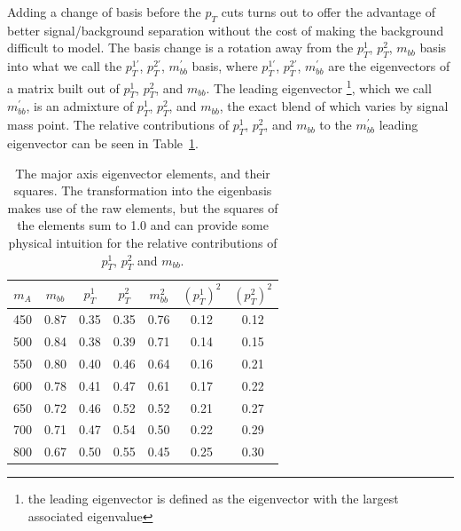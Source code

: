 Adding a change of basis before the $p_T$ cuts turns out to offer the advantage
of better signal/background separation without the cost of making the background
difficult to model.  The basis change is a rotation away from the $p_T^1$, 
$p_T^2$, $m_{bb}$ basis into what we call the $p_T^{1'}$, $p_T^{2'}$, $m_{bb}^{'}$
basis, where $p_T^{1'}$, $p_T^{2'}$, $m_{bb}^{'}$ are the eigenvectors of 
a matrix built out of $p_T^1$, $p_T^2$, and $m_{bb}$.  The leading eigenvector 
\footnote{the leading eigenvector is defined as the eigenvector with the largest
associated eigenvalue}, which we call $m_{bb}^{'}$, is an admixture of 
$p_T^1$, $p_T^2$, and $m_{bb}$, the exact blend of which varies by signal mass
point.  The relative contributions of $p_T^1$, $p_T^2$, and $m_{bb}$ to the $m_{bb}^{'}$
leading eigenvector can be seen in Table~\ref{tab:eigenvector_elements}.


\begin{table}
    \center
    \caption{The major axis eigenvector elements, and their squares.  The
    transformation into the eigenbasis makes use of the raw elements, but the
    squares of the elements sum to 1.0 and can provide some physical intuition
    for the relative contributions of $p_T^1$, $p_T^2$ and $m_{bb}$. \label{tab:eigenvector_elements}}
    \begin{tabular}{ c c c c c c c } \hline \hline
        $m_A$ & $m_{bb}$ & $p_T^1$ & $p_T^2$ & $m_{bb}^2$ & $(p_T^{1})^2$ & $(p_T^2)^2$ \\ \hline
        450 & 0.87 & 0.35 & 0.35 & 0.76 & 0.12 & 0.12 \\
        500 & 0.84 & 0.38 & 0.39 & 0.71 & 0.14 & 0.15 \\
        550 & 0.80 & 0.40 & 0.46 & 0.64 & 0.16 & 0.21 \\
        600 & 0.78 & 0.41 & 0.47 & 0.61 & 0.17 & 0.22 \\
        650 & 0.72 & 0.46 & 0.52 & 0.52 & 0.21 & 0.27 \\
        700 & 0.71 & 0.47 & 0.54 & 0.50 & 0.22 & 0.29 \\
        800 & 0.67 & 0.50 & 0.55 & 0.45 & 0.25 & 0.30 \\ 
        \hline
    \end{tabular}
\end{table} 

